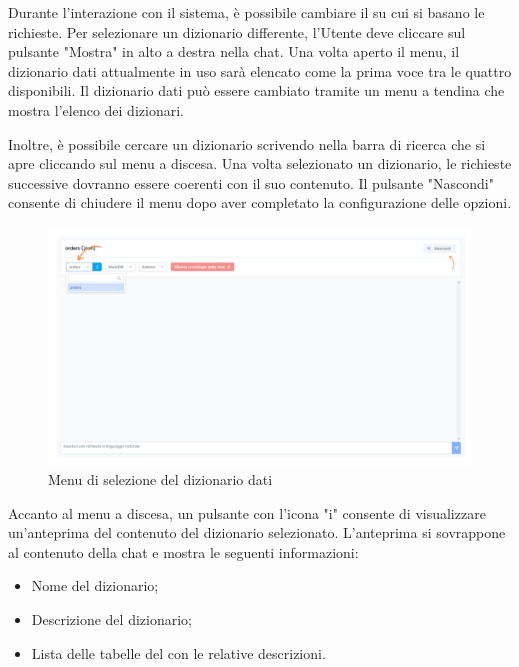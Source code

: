 
\par Durante l'interazione con il sistema, è possibile cambiare il  su cui si basano le richieste. Per selezionare un dizionario differente, l'Utente deve cliccare sul pulsante "Mostra" in alto a destra nella chat. Una volta aperto il menu, il dizionario dati attualmente in uso sarà elencato come la prima voce tra le quattro disponibili. Il dizionario dati può essere cambiato tramite un menu a tendina che mostra l'elenco dei dizionari.

\par Inoltre, è possibile cercare un dizionario scrivendo nella barra di ricerca che si apre cliccando sul menu a discesa. Una volta selezionato un dizionario, le richieste successive dovranno essere coerenti con il suo contenuto. Il pulsante "Nascondi" consente di chiudere il menu dopo aver completato la configurazione delle opzioni.

\begin{figure}[H]
  \centering
  \includegraphics[width=1\textwidth]{assets/cambio_dizionariodati.png}
  \caption{Menu di selezione del dizionario dati}
\end{figure}

 \label{sec:info-dizionario}

\par Accanto al menu a discesa, un pulsante con l'icona "i" consente di visualizzare un'anteprima del contenuto del dizionario selezionato. L'anteprima si sovrappone al contenuto della chat e mostra le seguenti informazioni:
\begin{itemize}
  \item Nome del dizionario;
  \item Descrizione del dizionario;
  \item Lista delle tabelle del  con le relative descrizioni.
\end{itemize}

